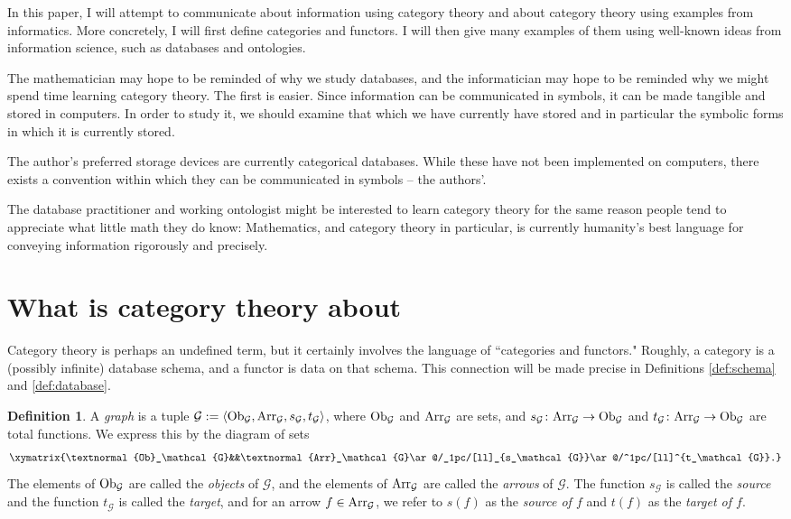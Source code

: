\documentclass{amsart}
\def\tn{\textnormal}
\def\mc{\mathcal}
\def\Hom{\tn{Arr}}
\def\Ob{\tn{Ob}}
\def\to{\rightarrow}
\def\taking{\colon}
\def\la{\langle}
\def\ra{\rangle}
\def\mcG{\mc{G}}
\theoremstyle{remark}
\theoremstyle{definition}
\newtheorem{definition}[theorem]{Definition}
\begin{document}
In this paper, I will attempt to communicate about information using category theory and about category theory using examples from informatics.  More concretely, I will first define categories and functors.  I will then give many examples of them using well-known ideas from information science, such as databases and ontologies.

The mathematician may hope to be reminded of why we study databases, and the informatician may hope to be reminded why we might spend time learning category theory.  The first is easier.  Since information can be communicated in symbols, it can be made tangible and stored in computers.  In order to study it, we should examine that which we have currently have stored and in particular the symbolic forms in which it is currently stored.  

The author's preferred storage devices are currently categorical databases.  While these have not been implemented on computers, there exists a convention within which they can be communicated in symbols -- the authors'.  

The database practitioner and working ontologist might be interested to learn category theory for the same reason people tend to appreciate what little math they do know: Mathematics, and category theory in particular, is currently humanity's best language for conveying information rigorously and precisely.  

\section{What is category theory about}

Category theory is perhaps an undefined term, but it certainly involves the language of ``categories and functors."  Roughly, a category is a (possibly infinite) database schema, and a functor is data on that schema.  This connection will be made precise in Definitions \ref{def:schema} and \ref{def:database}.

\begin{definition}

A {\em graph} is a tuple $\mcG:=\la\Ob_\mcG,\Hom_\mcG,s_\mcG,t_\mcG\ra$, where $\Ob_\mcG$ and $\Hom_\mcG$ are sets, and $s_\mcG\taking\Hom_\mcG\to\Ob_\mcG$ and $t_\mcG\taking\Hom_\mcG\to\Ob_\mcG$ are total functions.  We express this by the diagram of sets $$\xymatrix{\Ob_\mcG&&\Hom_\mcG\ar@/_1pc/[ll]_{s_\mcG}\ar@/^1pc/[ll]^{t_\mcG}.}$$  The elements of $\Ob_\mcG$ are called the {\em objects} of $\mcG$, and the elements of $\Hom_\mcG$ are called the {\em arrows} of $\mcG$.  The function $s_\mcG$ is called the {\em source} and the function $t_\mcG$ is called the {\em target}, and for an arrow $f\in\Hom_\mcG$, we refer to $s(f)$ as the {\em source of $f$} and $t(f)$ as the {\em target of $f$}.

\end{definition}
\end{document}

